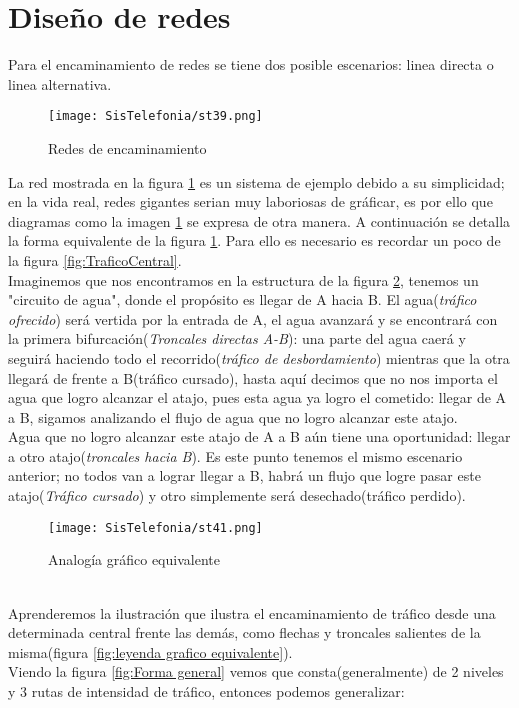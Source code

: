 \documentclass[11pt,fleqn]{book} %
\begin{document}
\section{Diseño de redes}
Para el encaminamiento de redes se tiene dos posible escenarios: linea directa o linea alternativa.
\begin{figure}[ht]
\centering\texttt{[image: SisTelefonia/st39.png]}
\caption{Redes de encaminamiento}
\label{fig:Rutas}
\end{figure}
La red mostrada en la figura \ref{fig:Rutas} es un sistema de ejemplo debido a su simplicidad; en la vida real, redes gigantes serian muy laboriosas de gráficar, es por ello que diagramas como la imagen \ref{fig:Rutas} se expresa de otra manera. A continuación se detalla la forma equivalente de la figura \ref{fig:Rutas}. Para ello es necesario es recordar un poco de la figura \ref{fig:TraficoCentral}.\\
Imaginemos que nos encontramos en la estructura de la figura \ref{fig:analogia}, tenemos un "circuito de agua", donde el propósito es llegar de A hacia B. El agua(\textit{tráfico ofrecido}) será vertida por la entrada de A, el agua avanzará y se encontrará con la primera bifurcación(\textit{Troncales directas A-B}): una parte del agua caerá y seguirá haciendo todo el recorrido(\textit{tráfico de desbordamiento}) mientras que la otra llegará de frente a B(tráfico cursado), hasta aquí decimos que no nos importa el agua que logro alcanzar el atajo, pues esta agua ya logro el cometido: llegar de A a B, sigamos analizando el flujo de agua que no logro alcanzar este atajo.\\
Agua que no logro alcanzar este atajo de A a B aún tiene una oportunidad: llegar a otro atajo(\textit{troncales hacia B}). Es este punto tenemos el mismo escenario anterior; no todos van a lograr llegar a B, habrá un flujo que logre pasar este atajo(\textit{Tráfico cursado}) y otro simplemente será desechado(tráfico perdido).\\
\begin{figure}[h!]
\centering\texttt{[image: SisTelefonia/st41.png]}
\caption{Analogía gráfico equivalente}
\label{fig:analogia}
\end{figure}
\\Aprenderemos la ilustración que ilustra el encaminamiento de tráfico desde una determinada central frente las demás, como flechas y troncales salientes de la misma(figura \ref{fig:leyenda grafico equivalente}). \\
Viendo la figura \ref{fig:Forma general} vemos que consta(generalmente) de 2 niveles y 3 rutas de intensidad de tráfico, entonces podemos generalizar:
\end{document}
